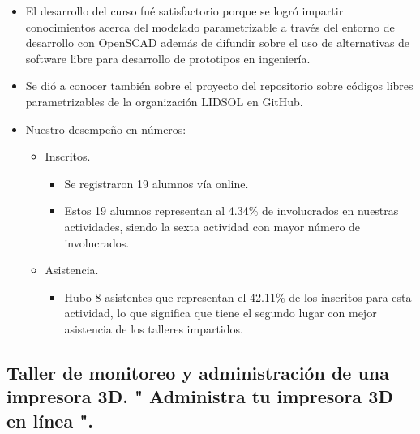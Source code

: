 \documentclass[a4paper,11pt]{article}                 %
\begin{document}
  \begin{itemize}
    \item El desarrollo del curso fué satisfactorio porque se logró impartir conocimientos acerca del modelado parametrizable a través del entorno de desarrollo con OpenSCAD además de difundir sobre el uso de alternativas de software libre para desarrollo de prototipos en ingeniería.
    
    \item Se dió a conocer también sobre el proyecto del repositorio sobre códigos libres parametrizables de la organización LIDSOL en GitHub.
    
    
    \item Nuestro desempeño en números:
    
    \begin{itemize}

    
    \item Inscritos.
    \begin{itemize}
      \item Se registraron 19 alumnos vía online.
      \item Estos 19 alumnos representan al 4.34\% de involucrados en nuestras actividades, siendo la sexta actividad con mayor número de involucrados. 
    \end{itemize}
    
    \item Asistencia.
    \begin{itemize}
      \item Hubo 8 asistentes que representan el 42.11\% de los inscritos para esta actividad, lo que significa que tiene el segundo lugar con mejor asistencia de los talleres impartidos. 
    \end{itemize}
    \end{itemize} 
    
  \end{itemize}
  
  
  \subsection{Taller de monitoreo y administración de una impresora 3D. " {Administra} tu impresora 3D en línea ".}  
  
\end{document}
